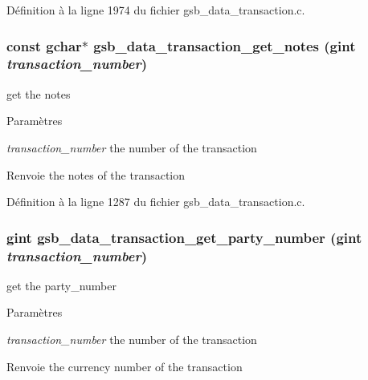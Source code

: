 Définition à la ligne 1974 du fichier gsb\_\-data\_\-transaction.c.

\subsubsection[{gsb\_\-data\_\-transaction\_\-get\_\-notes}]{\setlength{\rightskip}{0pt plus 5cm}const gchar$\ast$ gsb\_\-data\_\-transaction\_\-get\_\-notes (gint {\em transaction\_\-number})}\label{gsb__data__transaction_8h_ad73b393673217f5b9cc295c74e030550}
get the notes


\begin{DoxyParams}{Paramètres}
\item[{\em transaction\_\-number}]the number of the transaction\end{DoxyParams}
\begin{DoxyReturn}{Renvoie}
the notes of the transaction 
\end{DoxyReturn}


Définition à la ligne 1287 du fichier gsb\_\-data\_\-transaction.c.

\subsubsection[{gsb\_\-data\_\-transaction\_\-get\_\-party\_\-number}]{\setlength{\rightskip}{0pt plus 5cm}gint gsb\_\-data\_\-transaction\_\-get\_\-party\_\-number (gint {\em transaction\_\-number})}\label{gsb__data__transaction_8h_afa032df45afa2ad7a4be48449a7e8d15}
get the party\_\-number


\begin{DoxyParams}{Paramètres}
\item[{\em transaction\_\-number}]the number of the transaction\end{DoxyParams}
\begin{DoxyReturn}{Renvoie}
the currency number of the transaction 
\end{DoxyReturn}


